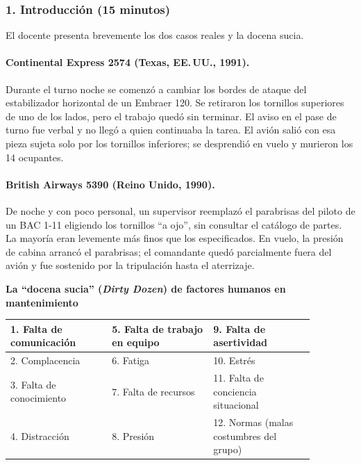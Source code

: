 \subsubsection*{1. Introducción (15 minutos)}
El docente presenta brevemente los dos casos reales y la docena sucia.

\paragraph*{Continental Express 2574 (Texas, EE.\,UU., 1991).}
Durante el turno noche se comenzó a cambiar los bordes de ataque del estabilizador
horizontal de un Embraer 120. Se retiraron los tornillos superiores de uno de los lados,
pero el trabajo quedó sin terminar. El aviso en el pase de turno fue verbal y no llegó a
quien continuaba la tarea. El avión salió con esa pieza sujeta solo por los tornillos
inferiores; se desprendió en vuelo y murieron los 14 ocupantes.

\paragraph*{British Airways 5390 (Reino Unido, 1990).}
De noche y con poco personal, un supervisor reemplazó el parabrisas del piloto de un
BAC 1-11 eligiendo los tornillos ``a ojo'', sin consultar el catálogo de partes. La mayoría
eran levemente más finos que los especificados. En vuelo, la presión de cabina arrancó el
parabrisas; el comandante quedó parcialmente fuera del avión y fue sostenido por la
tripulación hasta el aterrizaje.

\begin{center}
\small
\textbf{La ``docena sucia'' (\textit{Dirty Dozen}) de factores humanos en mantenimiento}\\[3pt]
\begin{tabular}{|p{0.29\linewidth}|p{0.29\linewidth}|p{0.29\linewidth}|}
\hline
1. Falta de comunicación & 5. Falta de trabajo en equipo & 9. Falta de asertividad \\ \hline
2. Complacencia & 6. Fatiga & 10. Estrés \\ \hline
3. Falta de conocimiento & 7. Falta de recursos & 11. Falta de conciencia situacional \\ \hline
4. Distracción & 8. Presión & 12. Normas (malas costumbres del grupo) \\ \hline
\end{tabular}
\end{center}

